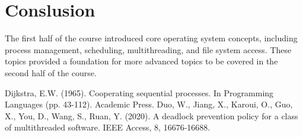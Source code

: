 \documentclass[12pt]{article}
\begin{document}
\section{Conslusion}
The first half of the course introduced core operating system concepts,
including process management, scheduling, multithreading, and file system
access. These topics provided a foundation for more advanced topics to be
covered in the second half of the course.

\begin{thebibliography}{9}
     Dijkstra, E.W. (1965). Cooperating sequential processes. In Programming Languages (pp. 43-112). Academic Press.
    Duo, W., Jiang, X., Karoui, O., Guo, X., You, D., Wang, S., Ruan, Y. (2020). A deadlock prevention policy for a class of multithreaded software. IEEE Access, 8, 16676-16688.
\end{thebibliography}
\end{document}
